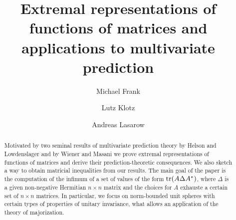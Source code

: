 \documentclass{amsart}
\begin{document}
\newtheorem{thm}{Theorem}[section]
\newtheorem{pro}[thm]{Proposition}
\newtheorem{cor}[thm]{Corollary}
\newtheorem{lem}[thm]{Lemma}
\newtheorem*{problemHL}{Problem (HL)}
\theoremstyle{definition}
\newtheorem{dfn}[thm]{Definition}
\theoremstyle{remark}
\newtheorem{rmk}[thm]{Remark}
\newtheorem{exe}[thm]{Example}




\title[Extremal representations of functions of matrices]{Extremal representations of functions of matrices and applications to multivariate prediction}
\author{Michael Frank}
\address[M. Frank and A. Lasarow]{HTWK Leipzig, Fakult\"at f\"ur Informatik und Medien, Gustav-Freytag-Str.\,42a, D-04277 Leipzig, Germany}
\author{Lutz Klotz}
\address[L. Klotz]{E.-v.-Brockdorff-Str. 16, D-04159 Leipzig, Germany}
\author{Andreas Lasarow}


\begin{abstract}
Motivated by two seminal results of multivariate prediction theory by Helson and Lowdenslager and by Wiener and Masani we prove extremal representations of functions of matrices and derive their prediction-theoretic consequences. We also sketch a way to obtain matricial inequalities from our results. The main goal of the paper is the computation of the infimum of a set of values of the form ${\rm tr}(A \Delta A^*)$, where $\Delta$ is a given non-negative Hermitian $n \times n$ matrix and the choices for $A$ exhauste a certain set of $n \times n$ matrices. In particular, we focus on norm-bounded unit spheres with certain types of properties of unitary invariance, what allows an application of the theory of majorization.
\end{abstract}
\end{document}
